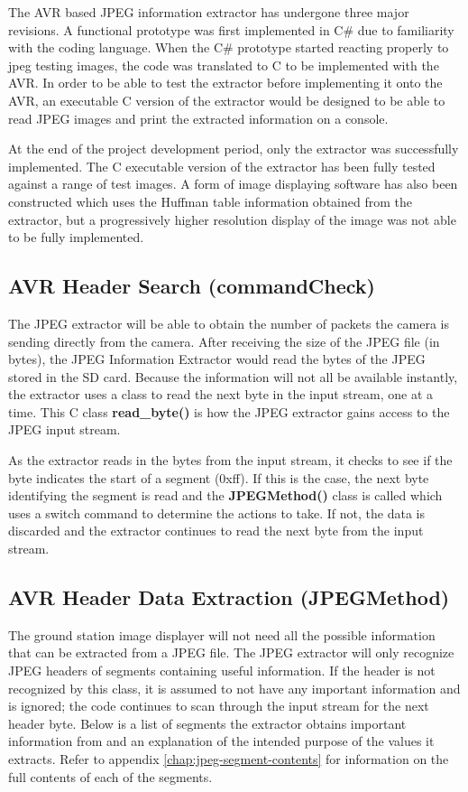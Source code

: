 The AVR based JPEG information extractor has undergone
three major revisions. A functional prototype was first
implemented in C\# due to familiarity with the coding language.
When the C\# prototype started reacting properly to 
jpeg testing images, the code was translated to C to be
implemented with the AVR. In order to be able to test
the extractor before implementing it onto the AVR, an 
executable C version of the extractor would be designed
to be able to read JPEG images and print the extracted
information on a console.

At the end of the project development period, only the 
extractor was successfully implemented. The C executable 
version of the extractor has been fully tested against 
a range of test images. A form of image displaying 
software has also been constructed which uses the 
Huffman table information obtained from the extractor, 
but a progressively higher resolution display of 
the image was not able to be fully implemented.

\subsection{AVR Header Search (commandCheck)}

The JPEG extractor will be able to obtain the 
number of packets the camera is sending directly from the camera.
After receiving the size of the JPEG file (in bytes), 
the JPEG Information Extractor would read the bytes of the JPEG stored in the SD card. 
Because the information will not all be available instantly, 
the extractor uses a class to read the next byte in the input stream, one at a time. 
This C class \textbf{read\_byte()} is how the JPEG extractor 
gains access to the JPEG input stream. 

As the extractor reads in the bytes from the input stream, it checks to see if the byte indicates the start of a segment (0xff). 
If this is the case, the next byte identifying the segment is read and the \textbf{JPEGMethod()} class is 
called which uses a switch command to determine the actions to take. 
If not, the data is discarded and the extractor continues 
to read the next byte from the input stream. 

\subsection{AVR Header Data Extraction (JPEGMethod)}

The ground station image displayer will not need all the possible information that can be extracted from a JPEG file. 
The JPEG extractor will only recognize JPEG headers of segments containing useful information.
If the header is not recognized by this class, 
it is assumed to not have any important information and is ignored; 
the code continues to scan through the input stream for the next header byte. 
Below is a list of segments the extractor obtains important information from 
and an explanation of the intended purpose of the values it extracts. 
Refer to appendix \ref{chap:jpeg-segment-contents} for information on the full contents of each
of the segments.


